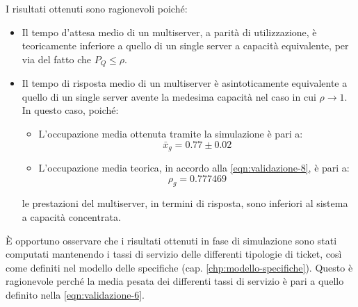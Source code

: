 I risultati ottenuti sono ragionevoli poiché:
\begin{itemize}
\item Il tempo d'attesa medio di un multiserver, a parità di utilizzazione, è teoricamente inferiore a quello di un single server a capacità equivalente, per via del fatto che $P_Q \leq \rho$.
\item Il tempo di risposta medio di un multiserver è asintoticamente equivalente a quello di un single server avente la medesima capacità nel caso in cui $\rho\to 1$. In questo caso, poiché:
\begin{itemize}
\item L'occupazione media ottenuta tramite la simulazione è pari a:
\begin{equation}
\bar{x}_g = 0.77 \pm 0.02
\end{equation}
\item L'occupazione media teorica, in accordo alla \ref{eqn:validazione-8}, è pari a:
\begin{equation}
\rho_g = 0.777469
\end{equation}
\end{itemize}
le prestazioni del multiserver, in termini di risposta, sono inferiori al sistema a capacità concentrata.
\end{itemize}

È opportuno osservare che i risultati ottenuti in fase di simulazione sono stati computati mantenendo i tassi di servizio delle differenti tipologie di ticket, così come definiti nel modello delle specifiche (cap. \ref{chp:modello-specifiche}). Questo è ragionevole perché la media pesata dei differenti tassi di servizio è pari a quello definito nella \ref{eqn:validazione-6}.


